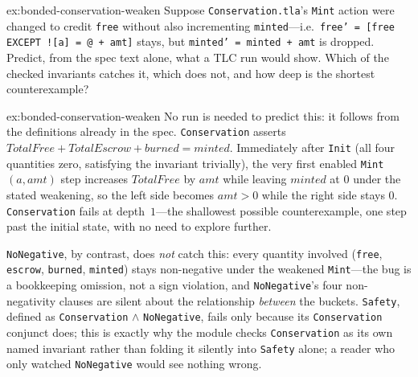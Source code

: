\documentclass[11pt,a4paper]{article}
\theoremstyle{definition}
\theoremstyle{remark}
\begin{document}
\begin{pdexercise}[kind=Open,rating=3]{ex:bonded-conservation-weaken}
Suppose \texttt{Conservation.tla}'s \texttt{Mint} action were changed to credit \texttt{free} without also incrementing \texttt{minted}---i.e.\ \texttt{free' = [free EXCEPT ![a] = @ + amt]} stays, but \texttt{minted' = minted + amt} is dropped. Predict, from the spec text alone, what a TLC run would show. Which of the checked invariants catches it, which does not, and how deep is the shortest counterexample?
\end{pdexercise}
\begin{pdsolution}{ex:bonded-conservation-weaken}
No run is needed to predict this: it follows from the definitions already in the spec. \texttt{Conservation} asserts $\mathit{TotalFree} + \mathit{TotalEscrow} + \mathit{burned} = \mathit{minted}$. Immediately after \texttt{Init} (all four quantities zero, satisfying the invariant trivially), the very first enabled \texttt{Mint}$(a, \mathit{amt})$ step increases $\mathit{TotalFree}$ by $\mathit{amt}$ while leaving $\mathit{minted}$ at $0$ under the stated weakening, so the left side becomes $\mathit{amt} > 0$ while the right side stays $0$. \texttt{Conservation} fails at depth~$1$---the shallowest possible counterexample, one step past the initial state, with no need to explore further.

\texttt{NoNegative}, by contrast, does \emph{not} catch this: every quantity involved (\texttt{free}, \texttt{escrow}, \texttt{burned}, \texttt{minted}) stays non-negative under the weakened \texttt{Mint}---the bug is a bookkeeping omission, not a sign violation, and \texttt{NoNegative}'s four non-negativity clauses are silent about the relationship \emph{between} the buckets. \texttt{Safety}, defined as \texttt{Conservation} $\wedge$ \texttt{NoNegative}, fails only because its \texttt{Conservation} conjunct does; this is exactly why the module checks \texttt{Conservation} as its own named invariant rather than folding it silently into \texttt{Safety} alone; a reader who only watched \texttt{NoNegative} would see nothing wrong.
\end{pdsolution}

\end{document}
